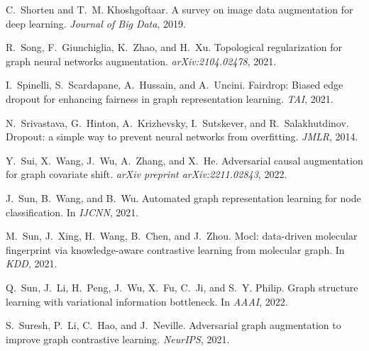 \documentclass[11pt]{article}
\begin{document}
\begin{thebibliography}{10}
\begin{small}
C.~Shorten and T.~M. Khoshgoftaar.
\newblock A survey on image data augmentation for deep learning.
\newblock \emph{Journal of Big Data}, 2019.

R.~Song, F.~Giunchiglia, K.~Zhao, and H.~Xu.
\newblock Topological regularization for graph neural networks augmentation.
\newblock \emph{arXiv:2104.02478}, 2021.

I.~Spinelli, S.~Scardapane, A.~Hussain, and A.~Uncini.
\newblock Fairdrop: Biased edge dropout for enhancing fairness in graph
  representation learning.
\newblock \emph{TAI}, 2021.

N.~Srivastava, G.~Hinton, A.~Krizhevsky, I.~Sutskever, and R.~Salakhutdinov.
\newblock Dropout: a simple way to prevent neural networks from overfitting.
\newblock \emph{JMLR}, 2014.

Y.~Sui, X.~Wang, J.~Wu, A.~Zhang, and X.~He.
\newblock Adversarial causal augmentation for graph covariate shift.
\newblock \emph{arXiv preprint arXiv:2211.02843}, 2022.

J.~Sun, B.~Wang, and B.~Wu.
\newblock Automated graph representation learning for node classification.
\newblock In \emph{IJCNN}, 2021{}.

M.~Sun, J.~Xing, H.~Wang, B.~Chen, and J.~Zhou.
\newblock Mocl: data-driven molecular fingerprint via knowledge-aware
  contrastive learning from molecular graph.
\newblock In \emph{KDD}, 2021{}.

Q.~Sun, J.~Li, H.~Peng, J.~Wu, X.~Fu, C.~Ji, and S.~Y. Philip.
\newblock Graph structure learning with variational information bottleneck.
\newblock In \emph{AAAI}, 2022.

S.~Suresh, P.~Li, C.~Hao, and J.~Neville.
\newblock Adversarial graph augmentation to improve graph contrastive learning.
\newblock \emph{NeurIPS}, 2021.


\end{small}
\end{thebibliography}
\end{document}
